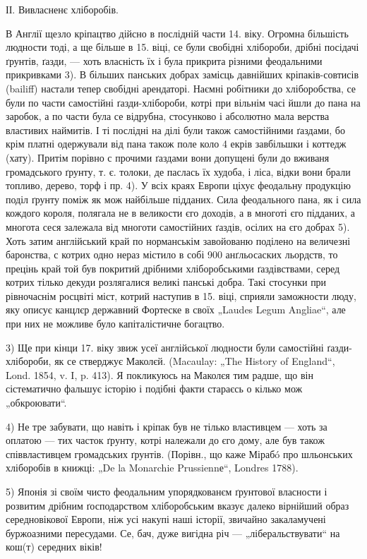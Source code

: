 ІІ. Вивласненє хліборобів.

В Англії щезло кріпацтво дійсно в послідній части 14. віку. Огромна більшість людности тоді, а ще
більше в 15. віці, се були свобідні хлібороби, дрібні посідачі ґрунтів, ґазди, — хоть власність їх і
була прикрита різними феодальними прикривками 3). В більших панських добрах замісць давнійших
кріпаків-совтисів (bailiff) настали тепер свобідні арендаторі. Наємні робітники до хліборобства, се
були по части самостійні ґазди-хлібороби, котрі при вільнім часі йшли до пана на заробок, а по части
була се відрубна, стосунково і абсолютно мала верства властивих наймитів. І ті послідні на ділі були
також самостійними ґаздами, бо крім платні одержували від пана також поле коло 4 екрів завбільшки і
коттедж (хату). Притім порівно с прочими ґаздами вони допущені були до вживаня громадського ґрунту,
т. є. толоки, де паслась їх худоба, і ліса, відки вони брали топливо, дерево, торф і пр. 4). У всіх
краях Европи ціхує феодальну продукцію поділ ґрунту поміж як мож найбільше підданих. Сила
феодального пана, як і сила кождого короля, полягала не в великости єго доходів, а в многоті єго
підданих, а многота сеся залежала від многоти самостійних ґаздів, осілих на єго добрах 5). Хоть
затим англійський край по норманськім завойованю поділено на величезні баронства, с котрих одно
нераз містило в собі 900 анґльосаских льордств, то прецінь край той був покритий дрібними
хліборобськими ґаздівствами, серед котрих тілько декуди розлягалися великі панські добра. Такі
стосунки при рівночаснім росцвіті міст, котрий наступив в 15. віці, сприяли заможности люду, яку
описує канцлєр державний Фортеске в своїх „Laudes Legum Angliae“, але при них не можливе було
капіталістичне богацтво.

3)  Ще при кінци 17. віку звиж  усеї англійської людности були самостійні ґазди-хлібороби, як се
стверджує Маколєй. (Macaulay: „The History of England“, Lond. 1854, v. I, p. 413). Я покликуюсь на
Маколєя тим радше, що він сістематично фальшує історію і подібні факти стараєсь о кілько мож
„обкроювати“.

4) Не тре забувати, що навіть і кріпак був не тілько властивцем — хоть за оплатою — тих часток
ґрунту, котрі належали до єго дому, але був також співвластивцем громадських ґрунтів. (Порівн., що
каже Мірабó про шльонських хліборобів в книжці: „De la Monarchie Prussiennе“, Londres 1788).

5) Японія зі своїм чисто феодальним упорядкованєм ґрунтової власности і розвитим дрібним
ґосподарством хліборобським вказує далеко вірнійший образ середновікової Европи, ніж усі накупі наші
історії, звичайно закаламучені буржоазними пересудами. Се, бач, дуже вигідна річ —
„ліберальствувати“ на кош(т) середних віків!
